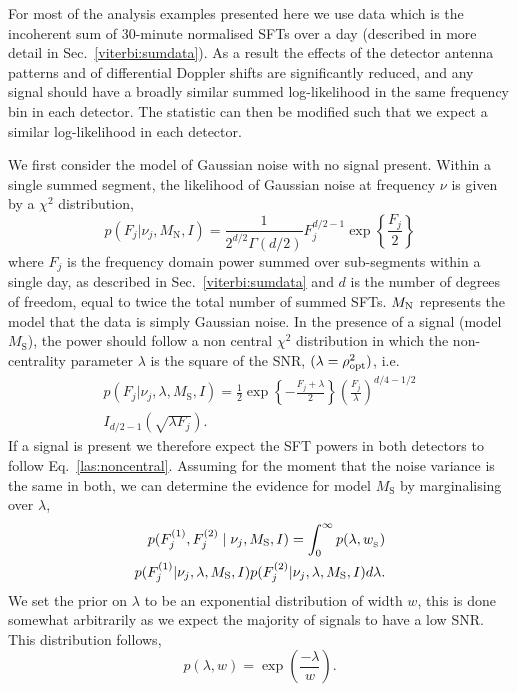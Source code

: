 %
%
For most of the analysis examples presented here we use data which is the incoherent sum of 30-minute normalised \acp{SFT} over a day (described in more detail in Sec.~\ref{viterbi:sumdata}). As a result the effects of the detector antenna patterns and of differential Doppler shifts are significantly reduced, and any signal should have a broadly similar summed log-likelihood in the same frequency bin in each detector. The statistic can then be modified such that we expect a similar log-likelihood in each detector.

We first consider the model of Gaussian noise with no signal present. Within
a single summed segment, the likelihood of Gaussian noise at
frequency $\nu$ is given by a $\chi^2$ distribution,
%
\begin{equation}
\label{las:central}
p(F_j|\nu_j,M_{\text{N}},I) = \frac{1}{2^{d/2}\Gamma(d/2)}F_j^{d/2 - 1}\exp{\left\{
\frac{F_j}{2}\right\}}
\end{equation}
%
where $F_j$ is the frequency domain power summed over sub-segments within a single day, as described in Sec.~\ref{viterbi:sumdata} and  $d$ is the number of degrees of freedom,  equal to twice the total number of summed SFTs.  $M_{\rm{N}}$ represents the model that the data is simply Gaussian noise. In the presence of a signal (model $M_{\text{S}}$), the power should follow a non central $ \chi^2 $ distribution in which the non-centrality parameter $\lambda$ is the square of the \ac{SNR}, $(\lambda = \rho_{\rm{opt}}^2 )$, i.e.
%
\begin{equation}
\label{las:noncentral}
\begin{split}
p(F_j|\nu_j,\lambda,M_{\text{S}},I) = \frac{1}{2} \exp{\left\{ -\frac{F_j+\lambda}{2}\right\}} \left( \frac{F_j}{\lambda} \right)^{d/4 - 1/2} \\
I_{d/2 -1}\left( \sqrt{\lambda F_j}\right).
\end{split}
\end{equation}
%
If a signal is present we therefore expect the \ac{SFT} powers in both detectors to follow Eq.~\ref{las:noncentral}.  Assuming for the moment that the noise variance is the same in both, we can determine the evidence for model $M_{\text{S}}$ by marginalising over $\lambda$,
%
\begin{equation}
\label{las:signal}
\begin{split}
p(F^{(1)}_{j},F^{(2)}_{j} \mid \nu_j,M_{\rm{S}},I) = \int_0^{\infty}  p(\lambda,w_{\rm_S}) \\
p(F^{(1)}_{j}|\nu_j,\lambda,M_{\text{S}},I)p(F^{(2)}_{j}|\nu_j,\lambda,M_{\text{S}},I) d\lambda.
\end{split}
\end{equation}
%
We set the prior on $\lambda$ to be an exponential distribution of width $w$, this is done somewhat arbitrarily as we expect the majority of signals to have a low \ac{SNR}. This distribution follows,
\begin{equation}
\label{las:prior}
p(\lambda,w) = \exp\left( \frac{-\lambda}{w}\right).
\end{equation}

